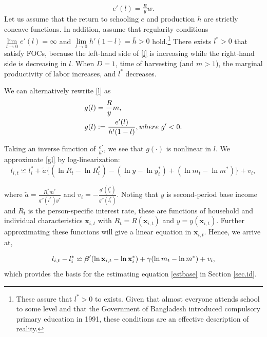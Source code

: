 \documentclass[12pt,letterpaper]{article}
\newcommand{\bfbeta}{\ensuremath{\mbox{\boldmath $\beta$}}}
\newcommand{\0}{\ensuremath{\mbox{\boldmath $0$}}}
\begin{document}
\begin{equation}
e'(l)  = \tfrac{R}{y}w.
\label{l'}
\end{equation}
Let us assume that the return to schooling $e$ and production $h$ are strictly concave functions. In addition, assume that regularity conditions $\lim\limits_{l\rightarrow 0}e'(l) = \infty$ and $\lim\limits_{l\rightarrow 0}h'(1-l) = \bar{h}>0$ hold.\footnote{These assure that $l^{*}>0$ to exists. Given that almost everyone attends school to some level and that the Government of Bangladesh introduced compulsory primary education in 1991, these conditions are an effective description of reality.} There exists $l^{*}>0$ that satisfy FOCs, because the left-hand side of \eqref{l} is increasing while the right-hand side is decreasing in $l$. When $D=1$, time of harvesting (and $m>1$), the marginal productivity of labor increases, and $l^{*}$ decreases.

We can alternatively rewrite \eqref{l} as
\begin{equation}
\begin{aligned}
g(l)    &=\frac{R}{y}m, \\
g(l)    &\mathrel{\mathop:}= \frac{e'(l)}{h'(1-l)}, where \ g'<0.
\end{aligned}
\label{gl}
\end{equation}

Taking an inverse function of $\frac{e'}{h'}$, we see that $g(\cdot)$ is nonlinear in $l$. We approximate \eqref{gl} by log-linearization:
\[
 l_{i,t}\backsimeq  l^{*}_{i}+\tilde{a}\{(\ln R_{t}-\ln R^{*}_{i}) - (\ln y-\ln y^{*}_{i}) + (\ln m_{t}-\ln m^{*})\} + v_{i},
\]


where $\tilde{a}=\tfrac{R^{*}_{i}m^{*}}{g''(l^{*})y^{*}}$ and $v_{i}=-\tfrac{g'(l^{*}_{i})}{g''(l^{*}_{i})}$. Noting that $y$ is second-period base income and $R_{t}$ is the person-specific interest rate, these are functions of household and individual characteristics $\textbf{x}_{i,t}$ with $R_{t}=R(\textbf{x}_{i,t})$ and $y=y(\textbf{x}_{i,t})$. Further approximating these functions will give a linear equation in $\textbf{x}_{i,t}$. Hence, we arrive at,

\begin{equation}
 l_{i,t}- l^{*}_{i}\backsimeq \bfbeta'(\ln \textbf{x}_{i,t}-\ln \textbf{x}^{*}_{i}) + \gamma(\ln m_{t}-\ln m^{*}) + v_{i},
 \label{lsimeq}
\end{equation}
which provides the basis for the estimating equation \eqref{estbase} in Section \ref{sec.id}.
\end{document}
